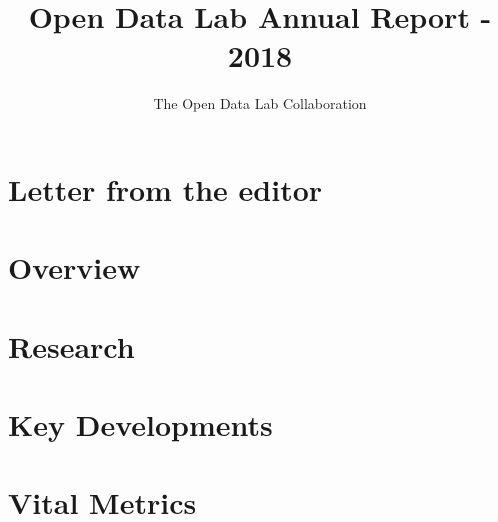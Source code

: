\documentclass[12pt,letterpaper]{report} %
\title{Open Data Lab Annual Report - 2018}
\author{The Open Data Lab Collaboration}
\begin{document}
\maketitle

\tableofcontents
\pagebreak

\chapter*{Letter from the editor}   %

\chapter{Overview} 

\chapter{Research} 

\chapter{Key Developments} 

\chapter{Vital Metrics} 
\end{document}
